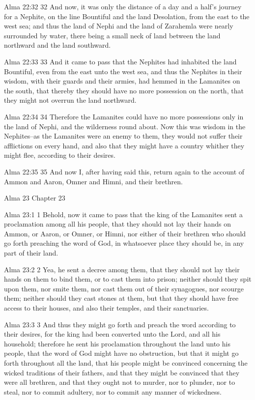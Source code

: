Alma 22:32
 32 And now, it was only the distance of a day and a half's
journey for a Nephite, on the line Bountiful and the land
Desolation, from the east to the west sea; and thus the land of
Nephi and the land of Zarahemla were nearly surrounded by water,
there being a small neck of land between the land northward and
the land southward.

Alma 22:33
 33 And it came to pass that the Nephites had inhabited the land
Bountiful, even from the east unto the west sea, and thus the
Nephites in their wisdom, with their guards and their armies, had
hemmed in the Lamanites on the south, that thereby they should
have no more possession on the north, that they might not overrun
the land northward.

Alma 22:34
 34 Therefore the Lamanites could have no more possessions only
in the land of Nephi, and the wilderness round about. Now this
was wisdom in the Nephites--as the Lamanites were an enemy to
them, they would not suffer their afflictions on every hand, and
also that they might have a country whither they might flee,
according to their desires.

Alma 22:35
 35 And now I, after having said this, return again to the
account of Ammon and Aaron, Omner and Himni, and their brethren.

Alma 23
Chapter 23

Alma 23:1
 1 Behold, now it came to pass that the king of the Lamanites
sent a proclamation among all his people, that they should not
lay their hands on Ammon, or Aaron, or Omner, or Himni, nor
either of their brethren who should go forth preaching the word
of God, in whatsoever place they should be, in any part of their
land.

Alma 23:2
 2 Yea, he sent a decree among them, that they should not lay
their hands on them to bind them, or to cast them into prison;
neither should they spit upon them, nor smite them, nor cast them
out of their synagogues, nor scourge them; neither should they
cast stones at them, but that they should have free access to
their houses, and also their temples, and their sanctuaries.

Alma 23:3
 3 And thus they might go forth and preach the word according to
their desires, for the king had been converted unto the Lord, and
all his household; therefore he sent his proclamation throughout
the land unto his people, that the word of God might have no
obstruction, but that it might go forth throughout all the land,
that his people might be convinced concerning the wicked
traditions of their fathers, and that they might be convinced
that they were all brethren, and that they ought not to murder,
nor to plunder, nor to steal, nor to commit adultery, nor to
commit any manner of wickedness.

